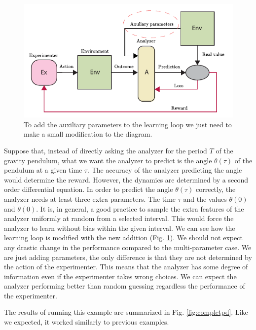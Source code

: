 \documentclass[11pt,a4paper,twoside]{report}
\newcommand{\+}{\textnormal{+} }
\theoremstyle{definition}
\numberwithin{equation}{chapter}
\begin{document}
  \begin{figure}
    \centering
    \includegraphics{figures/Auxiliary Parameters.pdf}
    \caption{To add the auxiliary parameters to the learning loop we just need
    to make a small modification to the diagram.}
    \label{fig:auxiliaryparameter}
  \end{figure}

  Suppose that, instead of directly asking the analyzer for the period $T$ of
  the gravity pendulum, what we want the analyzer to predict is the angle
  $\theta(\tau)$ of the pendulum at a given time $\tau$. The accuracy of the
  analyzer predicting the angle would determine the reward. However, the
  dynamics are determined by a second order differential equation. In order to
  predict the angle $\theta(\tau)$ correctly, the analyzer needs at least three
  extra parameters. The time $\tau$ and the values $\theta(0)$ and
  $\dot{\theta}(0)$. It is, in general, a good practice to sample the extra
  features of the analyzer uniformly at random from a selected interval. This
  would force the analyzer to learn without bias within the given interval. We
  can see how the learning loop is modified with the new addition (Fig.
  \ref{fig:auxiliaryparameter}). We should not expect any drastic change in the
  performance compared to the multi-parameter case. We are just adding
  parameters, the only difference is that they are not determined by the
  action of the experimenter. This means that the analyzer has some
  degree of information even if the experimenter takes wrong choices. We can
  expect the analyzer performing better than random guessing regardless the
  performance of the experimenter.
  
  \par The results of running this example are summarized in 
  Fig. \ref{fig:completpd}. Like we expected, it worked similarly to previous 
  examples.
\end{document}
